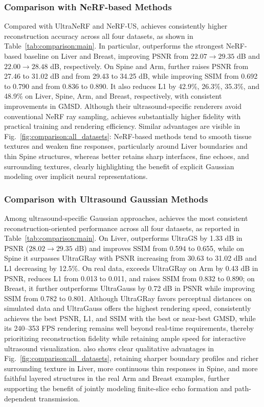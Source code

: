 \subsubsection{Comparison with NeRF-based Methods}

Compared with UltraNeRF and NeRF-US, \methodname{} achieves consistently
higher reconstruction accuracy across all four datasets, as shown in
Table~\ref{tab:comparison:main}. In particular, \methodname{} outperforms the
strongest NeRF-based baseline on Liver and Breast, improving PSNR from
$22.07\!\rightarrow\!29.35$ dB and $22.00\!\rightarrow\!28.48$ dB,
respectively. On Spine and Arm, \methodname{} further raises PSNR from
27.46 to 31.02 dB and from 29.43 to 34.25 dB, while improving SSIM from
0.692 to 0.790 and from 0.836 to 0.890. It also reduces L1 by 42.9\%, 26.3\%,
35.3\%, and 48.9\% on Liver, Spine, Arm, and Breast, respectively, with
consistent improvements in GMSD. Although their ultrasound-specific renderers
avoid conventional NeRF ray sampling, \methodname{} achieves substantially
higher fidelity with practical training and rendering efficiency.
Similar advantages are visible in
Fig.~\ref{fig:comparison:all_datasets}: NeRF-based methods tend to smooth
tissue textures and weaken fine responses, particularly around Liver
boundaries and thin Spine structures, whereas \methodname{} better retains
sharp interfaces, fine echoes, and surrounding textures, clearly highlighting the
benefit of explicit Gaussian modeling over implicit neural representations.

\subsubsection{Comparison with Ultrasound Gaussian Methods}

Among ultrasound-specific Gaussian approaches, \methodname{} achieves the most
consistent reconstruction-oriented performance across all four datasets, as
reported in Table~\ref{tab:comparison:main}. On Liver, \methodname{}
outperforms UltraGS by 1.33 dB in PSNR
($28.02\!\rightarrow\!29.35$ dB) and improves SSIM from 0.594 to 0.655,
while on Spine it surpasses UltraGRay with PSNR increasing from 30.63 to
31.02 dB and L1 decreasing by 12.5\%. On real data, \methodname{} exceeds
UltraGRay on Arm by 0.43 dB in PSNR, reduces L1 from 0.013 to 0.011, and
raises SSIM from 0.832 to 0.890; on Breast, it further outperforms UltraGauss
by 0.72 dB in PSNR while improving SSIM from 0.782 to 0.801. 
Although UltraGRay favors perceptual distances on simulated data and
UltraGauss offers the highest rendering speed, \methodname{} consistently
achieves the best PSNR, L1, and SSIM with the best or near-best GMSD, while
its 240--353 FPS rendering remains well beyond real-time requirements, thereby
prioritizing reconstruction fidelity while retaining ample speed for
interactive ultrasound visualization.
\methodname{} also shows clear qualitative advantages in
Fig.~\ref{fig:comparison:all_datasets}, retaining sharper boundary profiles
and richer surrounding texture in Liver, more continuous thin responses in
Spine, and more faithful layered structures in the real Arm and Breast
examples, further supporting the benefit of jointly modeling finite-slice echo
formation and path-dependent transmission.

